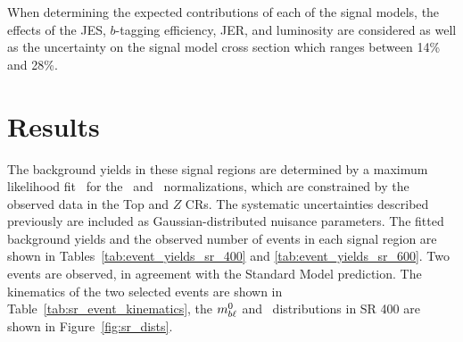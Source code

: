 \begin{table}[ht]
\caption{Summary of the effect of each considered sources of systematic
  uncertainty on the background estimate in SR~400 and SR~600. Several
  sources of theoretical systematic uncertainty which have a small
  effect on the total background estimate are grouped into the
  ``Other theory'' category.
  {\color{red} TODO update this table with broken down info and CRs.}
}
\label{tab:systematic_breakdown}
%
\end{table}

When determining the expected contributions of each of the signal models,
the effects of the JES, $b$-tagging efficiency, JER, and luminosity are
considered as well as the uncertainty on the signal model cross section which
ranges between 14\% and 28\%.

\section{Results}
\label{sec:results}

The background yields in these signal regions are determined by a maximum
likelihood fit~\cite{Baak:2014wma} for the \TTBAR\ and
\ZGAMMAJETS\ normalizations, which are constrained by the observed data in the
Top and $Z$ CRs.
The systematic uncertainties described previously are included as
Gaussian-distributed nuisance parameters.
The fitted background yields and the observed number of events in each
signal region are shown in Tables~\ref{tab:event_yields_sr_400} and
\ref{tab:event_yields_sr_600}. Two events are observed, in agreement with
the Standard Model prediction.  The kinematics of the two selected events
are shown in Table~\ref{tab:sr_event_kinematics}, the $m_{b\ell}^0$ and
\HT\ distributions in SR 400 are shown in Figure~\ref{fig:sr_dists}.

